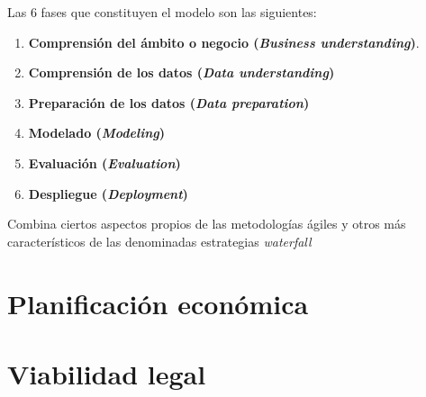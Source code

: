 Las 6 fases que constituyen el modelo son las siguientes:
\begin{enumerate}[itemsep=0.1em]
    \item \textbf{Comprensión del ámbito o negocio (\textit{Business understanding})}.
    \item \textbf{Comprensión de los datos (\textit{Data understanding})}
    \item \textbf{Preparación de los datos (\textit{Data preparation})}
    \item \textbf{Modelado (\textit{Modeling})}
    \item \textbf{Evaluación (\textit{Evaluation})}
    \item \textbf{Despliegue (\textit{Deployment})}
\end{enumerate}

Combina ciertos aspectos propios de las metodologías ágiles y otros más característicos de las denominadas estrategias \textit{waterfall}

\section{Planificación económica}

\section{Viabilidad legal}